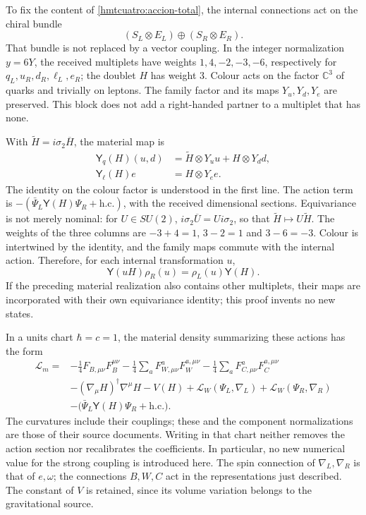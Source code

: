 To fix the content of \eqref{hmtcuatro:accion-total}, the internal connections act on the chiral bundle
\[
 (S_L\otimes E_L)\oplus(S_R\otimes E_R).
\]
That bundle is not replaced by a vector coupling. In the integer normalization \(y=6Y\), the received multiplets have weights \(1,4,-2,-3,-6\), respectively for \(q_L,u_R,d_R,\ell_L,e_R\); the doublet \(H\) has weight \(3\). Colour acts on the factor \(\mathbb C^3\) of quarks and trivially on leptons. The family factor and its maps \(Y_u,Y_d,Y_e\) are preserved. This block does not add a right-handed partner to a multiplet that has none.

With \(\widetilde H=i\sigma_2\overline H\), the material map is
\begin{equation}
 \begin{split}
 \mathsf Y_q(H)(u,d)&=
       \widetilde H\otimes Y_u u+H\otimes Y_d d,\\
 \mathsf Y_\ell(H)e&=H\otimes Y_e e .
 \end{split}
 \label{hmtcuatro:yukawa}
\end{equation}
The identity on the colour factor is understood in the first line. The action term is \(-(\bar\Psi_L\mathsf Y(H)\Psi_R+\mathrm{h.c.})\), with the received dimensional sections. Equivariance is not merely nominal: for \(U\in SU(2)\), \(i\sigma_2\overline U=U i\sigma_2\), so that \(\widetilde H\mapsto U\widetilde H\). The weights of the three columns are \(-3+4=1\), \(3-2=1\) and \(3-6=-3\). Colour is intertwined by the identity, and the family maps commute with the internal action. Therefore, for each internal transformation \(u\),
\begin{equation}
 \mathsf Y(uH)\rho_R(u)=\rho_L(u)\mathsf Y(H).
 \label{hmtcuatro:equivariancia-yukawa}
\end{equation}
If the preceding material realization also contains other multiplets, their maps are incorporated with their own equivariance identity; this proof invents no new states.

In a units chart \(\hbar=c=1\), the material density summarizing these actions has the form
\begin{equation}
 \begin{split}
 \mathcal L_m={}&-\frac14 F_{B,\mu\nu}F_B^{\mu\nu}
 -\frac14\sum_a F_{W,\mu\nu}^aF_W^{a,\mu\nu}
 -\frac14\sum_a F_{C,\mu\nu}^aF_C^{a,\mu\nu}\\
 &-(\nabla_\mu H)^\dagger\nabla^\mu H-V(H)
 +\mathcal L_W(\Psi_L,\nabla_L)+\mathcal L_W(\Psi_R,\nabla_R)\\
 &-\bigl(\bar\Psi_L\mathsf Y(H)\Psi_R+\mathrm{h.c.}\bigr).
 \end{split}
 \label{hmtcuatro:densidad-material}
\end{equation}
The curvatures include their couplings; these and the component normalizations are those of their source documents. Writing in that chart neither removes the action section nor recalibrates the coefficients. In particular, no new numerical value for the strong coupling is introduced here. The spin connection of \(\nabla_L,\nabla_R\) is that of \(e,\omega\); the connections \(B,W,C\) act in the representations just described. The constant of \(V\) is retained, since its volume variation belongs to the gravitational source.

